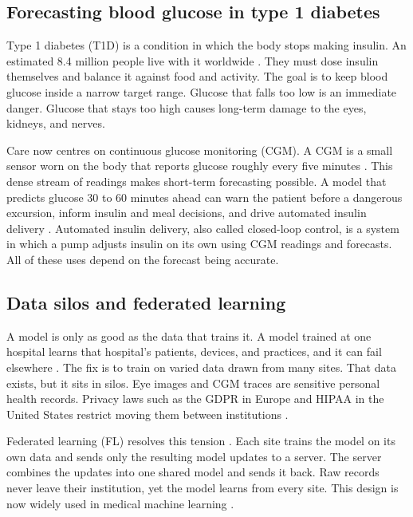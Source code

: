 \subsection{Forecasting blood glucose in type 1 diabetes}
\label{sec:intro-glucose}

Type 1 diabetes (T1D) is a condition in which the body stops making insulin. An estimated 8.4 million people live with it worldwide \citep{gregory2022t1d}. They must dose insulin themselves and balance it against food and activity. The goal is to keep blood glucose inside a narrow target range. Glucose that falls too low is an immediate danger. Glucose that stays too high causes long-term damage to the eyes, kidneys, and nerves.

Care now centres on continuous glucose monitoring (CGM). A CGM is a small sensor worn on the body that reports glucose roughly every five minutes \citep{battelino2019timeinrange}. This dense stream of readings makes short-term forecasting possible. A model that predicts glucose 30 to 60 minutes ahead can warn the patient before a dangerous excursion, inform insulin and meal decisions, and drive automated insulin delivery \citep{vettoretti2020cgm, bekiari2018artificialpancreas}. Automated insulin delivery, also called closed-loop control, is a system in which a pump adjusts insulin on its own using CGM readings and forecasts. All of these uses depend on the forecast being accurate.

\subsection{Data silos and federated learning}
\label{sec:intro-fl}

A model is only as good as the data that trains it. A model trained at one hospital learns that hospital's patients, devices, and practices, and it can fail elsewhere \citep{yang2024limits}. The fix is to train on varied data drawn from many sites. That data exists, but it sits in silos. Eye images and CGM traces are sensitive personal health records. Privacy laws such as the GDPR in Europe and HIPAA in the United States restrict moving them between institutions \citep{lotan2020privacy, ziller2024privacy}.

Federated learning (FL) resolves this tension \citep{mcmahan2017fedavg}. Each site trains the model on its own data and sends only the resulting model updates to a server. The server combines the updates into one shared model and sends it back. Raw records never leave their institution, yet the model learns from every site. This design is now widely used in medical machine learning \citep{rieke2020future}.

